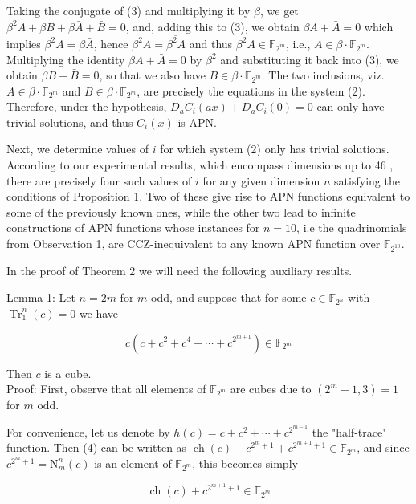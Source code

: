 \documentclass[10pt]{article}
\begin{document}
Taking the conjugate of (3) and multiplying it by $\beta$, we get $\beta^{2} A+\beta B+\beta \bar{A}+\bar{B}=0$, and, adding this to (3), we obtain $\beta A+\bar{A}=0$ which implies $\beta^{2} A=\beta \bar{A}$, hence $\beta^{2} A=\overline{\beta^{2} A}$ and thus $\beta^{2} A \in \mathbb{F}_{2^{m}}$, i.e., $A \in \beta \cdot \mathbb{F}_{2^{m}}$. Multiplying the identity $\beta A+\bar{A}=0$ by $\beta^{2}$ and substituting it back into (3), we obtain $\beta B+\bar{B}=0$, so that we also have $B \in \beta \cdot \mathbb{F}_{2^{m}}$. The two inclusions, viz. $A \in \beta \cdot \mathbb{F}_{2^{m}}$ and $B \in \beta \cdot \mathbb{F}_{2^{m}}$, are precisely the equations in the system (2). Therefore, under the hypothesis, $D_{a} C_{i}(a x)+D_{a} C_{i}(0)=0$ can only have trivial solutions, and thus $C_{i}(x)$ is APN.

Next, we determine values of $i$ for which system (2) only has trivial solutions. According to our experimental results, which encompass dimensions up to 46 , there are precisely four such values of $i$ for any given dimension $n$ satisfying the conditions of Proposition 1. Two of these give rise to APN functions equivalent to some of the previously known ones, while the other two lead to infinite constructions of APN functions whose instances for $n=10$, i.e the quadrinomials from Observation 1, are CCZ-inequivalent to any known APN function over $\mathbb{F}_{2^{10}}$.

In the proof of Theorem 2 we will need the following auxiliary results.

Lemma 1: Let $n=2 m$ for $m$ odd, and suppose that for some $c \in \mathbb{F}_{2^{n}}$ with $\operatorname{Tr}_{1}^{n}(c)=0$ we have


\begin{equation*}
c\left(c+c^{2}+c^{4}+\cdots+c^{2^{m+1}}\right) \in \mathbb{F}_{2^{m}} \tag{4}
\end{equation*}


Then $c$ is a cube.\\
Proof: First, observe that all elements of $\mathbb{F}_{2^{m}}$ are cubes due to $\left(2^{m}-1,3\right)=1$ for $m$ odd.

For convenience, let us denote by $h(c)=c+c^{2}+\cdots+ c^{2^{m-1}}$ the "half-trace" function. Then (4) can be written as $\operatorname{ch}(c)+c^{2^{m}+1}+c^{2^{m+1}+1} \in \mathbb{F}_{2^{m}}$, and since $c^{2^{m}+1}=\mathrm{N}_{m}^{n}(c)$ is an element of $\mathbb{F}_{2^{m}}$, this becomes simply


\begin{equation*}
\operatorname{ch}(c)+c^{2^{m+1}+1} \in \mathbb{F}_{2^{m}} \tag{5}
\end{equation*}
\end{document}
